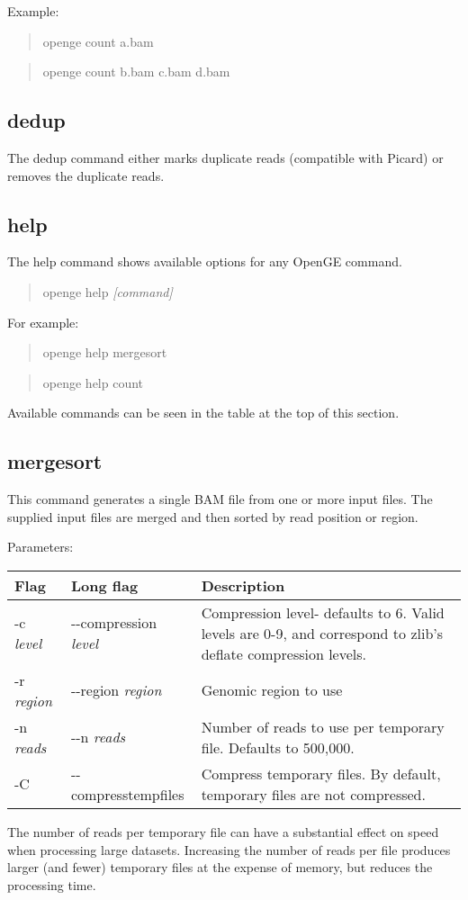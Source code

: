 \documentclass[11pt]{article}
\newcommand {\cmd}[1] {\begin{quote}#1\end{quote}}
\begin{document}
Example:
\cmd{openge count a.bam}
\cmd{openge count b.bam c.bam d.bam}

\subsection {dedup}
The dedup command either marks duplicate reads (compatible with Picard) or removes the duplicate reads. 

\subsection {help}
The help command shows available options for any OpenGE command. 

\cmd{openge help \textit{[command]}}

For example:

\cmd{openge help mergesort}

\cmd{openge help count}

Available commands can be seen in the table at the top of this section.


\subsection {mergesort}
This command generates a single BAM file from one or more input files. The supplied input files are merged and then sorted by read position or region.

Parameters:
\begin{center}
\begin{tabular}{llp{3.5in}}
\hline
Flag&Long flag&Description\\ \hline
-c \textit{level}&{-}{-}compression \textit{level}&Compression level- defaults to 6. Valid levels are 0-9, and correspond to zlib's deflate compression levels. \\
-r \textit{region}&{-}{-}region \textit{region}&Genomic region to use\\
-n \textit{reads}&{-}{-}n \textit{reads}&Number of reads to use per temporary file. Defaults to 500,000.\\
-C&{-}{-}compresstempfiles&Compress temporary files. By default, temporary files are not compressed.\\
\end{tabular}
\end{center}

The number of reads per temporary file can have a substantial effect on speed when processing large datasets. Increasing the number of reads per file produces larger (and fewer) temporary files at the expense of memory, but reduces the processing time.
\end{document}
